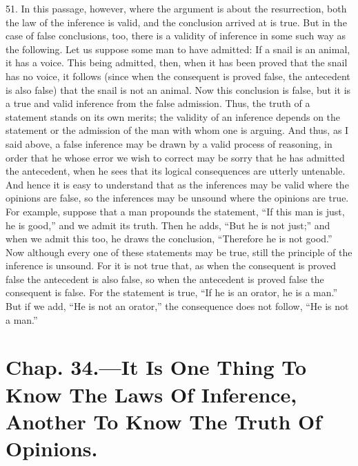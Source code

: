 51. In this passage, however, where the argument is about the
resurrection, both the law of the inference is valid, and the
conclusion arrived at is true. But in the case of false conclusions,
too, there is a validity of inference in some such way as the
following. Let us suppose some man to have admitted: If a snail is an
animal, it has a voice. This being admitted, then, when it has been
proved that the snail has no voice, it follows (since when the
consequent is proved false, the antecedent is also false) that the
snail is not an animal. Now this conclusion is false, but it is a true
and valid inference from the false admission. Thus, the truth of a
statement stands on its own merits; the validity of an inference
depends on the statement or the admission of the man with whom one is
arguing. And thus, as I said above, a false inference may be drawn by
a valid process of reasoning, in order that he whose error we wish to
correct may be sorry that he has admitted the antecedent, when he sees
that its logical consequences are utterly untenable. And hence it is
easy to understand that as the inferences may be valid where the
opinions are false, so the inferences may be unsound where the
opinions are true. For example, suppose that a man propounds the
statement, ``If this man is just, he is good,'' and we admit its
truth. Then he adds, ``But he is not just;'' and when we admit this
too, he draws the conclusion, ``Therefore he is not good.'' Now
although every one of these  statements may be true, still
the principle of the inference is unsound. For it is not true that, as
when the consequent is proved false the antecedent is also false, so
when the antecedent is proved false the consequent is false. For the
statement is true, ``If he is an orator, he is a man.'' But if we add,
``He is not an orator,'' the consequence does not follow, ``He is not
a man.''

\section{Chap. 34.\smaller---It Is One Thing To Know The Laws Of
Inference, Another To Know The Truth Of Opinions.}

